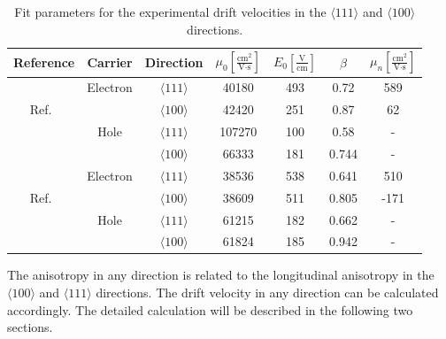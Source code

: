 \begin{table}[tbhp]
  \centering
  \begin{tabular}{ccccccc}\hline\hline
     Reference & Carrier & Direction & $\mu_{0} \left[ \frac{\mbox{cm}^{2}}{\mbox{V}\cdot\mbox{s}} \right]$ & $E_{0} \left[ \frac{\mbox{V}}{\mbox{cm}} \right]$ & $\beta$ & $\mu_{n} \left[ \frac{\mbox{cm}^{2}}{\mbox{V}\cdot\mbox{s}} \right]$ \\\hline
& Electron & $\langle111\rangle$ & 40180 & 493 & 0.72 & 589 \\
Ref.~\cite{miha}& & $\langle100\rangle$ & 42420 & 251 & 0.87 & 62\\
& Hole & $\langle111\rangle$ & 107270 & 100 & 0.58 & - \\
& & $\langle100\rangle$ & 66333 & 181 & 0.744 & - \\\hline\hline
& Electron & $\langle111\rangle$ & 38536 & 538 & 0.641 & 510 \\
Ref.~\cite{bart}& & $\langle100\rangle$ & 38609 & 511 & 0.805 & -171\\ 
& Hole & $\langle111\rangle$ & 61215 & 182 & 0.662 & - \\
& & $\langle100\rangle$ & 61824 & 185 & 0.942 & - \\\hline\hline
  \end{tabular}
  \caption{Fit parameters for the experimental drift velocities in the 
$\langle111\rangle$ and $\langle100\rangle$ directions.}
\label{tab:pars}
\end{table}

The anisotropy in any direction is related to the longitudinal anisotropy in the $\langle100\rangle$ and $\langle111\rangle$ directions. The drift velocity in any direction can be calculated accordingly. The detailed calculation will be described in the following two sections.


